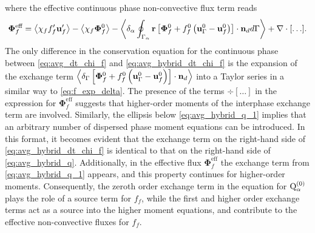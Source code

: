 where the effective continuous phase non-convective flux term reads 
\begin{align}
    \mathbf{\Phi}_f^\text{eff}
    = \left<\chi_f f_f' \textbf{u}_f'\right>
    - \left<\chi_f \bm\Phi_f^0\right>
    - \left<\delta_\alpha \oint_{\Gamma_{\alpha}} \textbf{r}\left[
        \mathbf{\Phi}_f^0
        + f_f^0
        \left(
            \textbf{u}_\Gamma^0
            - \textbf{u}_f^0
        \right)
    \right]
    \cdot \textbf{n}_d d\Gamma\right>
    + \mathbf{\nabla}\cdot[\ldots].
\end{align}
The only difference in the conservation equation for the continuous phase between \eqref{eq:avg_dt_chi_f} and \eqref{eq:avg_hybrid_dt_chi_f} is the expansion of the exchange term $\left<\delta_\Gamma \left[
    \mathbf{\Phi}_f^0
    + f_f^0
    \left(
        \textbf{u}_\Gamma ^0
        - \textbf{u}_f^0
    \right)
\right]
\cdot \textbf{n}_d\right>$ into a Taylor series in a similar way to \ref{eq:f_exp_delta}. 
The presence of the terms $\div[\ldots]$ in the expression for  $\mathbf{\Phi}_f^\text{eff}$ suggests that higher-order moments of the interphase exchange term are involved.
Similarly, the ellipsis below \ref{eq:avg_hybrid_q_1} implies that an arbitrary number of dispersed phase moment equations can be introduced. In this format, it becomes evident that the exchange term on the right-hand side of \ref{eq:avg_hybrid_dt_chi_f} is identical to that on the right-hand side of \ref{eq:avg_hybrid_q}. 
Additionally, in the effective flux $\mathbf{\Phi}_f^\text{eff}$ the exchange term from  \ref{eq:avg_hybrid_q_1} appears, and this property continues for higher-order moments.  
Consequently, the zeroth order exchange term in the equation for $\text Q_\alpha^{(0)}$ plays the role of a source term for $f_f$, while the first and higher order exchange terms act as a source into the higher moment equations, and contribute to the effective non-convective fluxes for $f_f$. 



